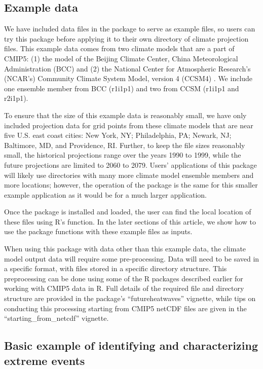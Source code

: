 \subsection{Example data}\label{example-data}

We have included data files in the package to serve as example files, so
users can try this package before applying it to their own directory of
climate projection files. This example data comes from two climate
models that are a part of CMIP5: (1) the model of the Beijing Climate
Center, China Meteorological Administration (BCC)
\citep{xin2013introduction} and (2) the National Center for Atmospheric
Research's (NCAR's) Community Climate System Model, version 4 (CCSM4)
\citep{gent2011community}. We include one ensemble member from BCC
(r1i1p1) and two from CCSM (r1i1p1 and r2i1p1).

To ensure that the size of this example data is reasonably small, we
have only included projection data for grid points from these climate
models that are near five U.S. east coast cities: New York, NY;
Philadelphia, PA; Newark, NJ; Baltimore, MD, and Providence, RI.
Further, to keep the file sizes reasonably small, the historical
projections range over the years 1990 to 1999, while the future
projections are limited to 2060 to 2079. Users' applications of this
package will likely use directories with many more climate model
ensemble members and more locations; however, the operation of the
package is the same for this smaller example application as it would be
for a much larger application.

Once the  package is installed and loaded, the user
can find the local location of these files using R's 
function. In the later sections of this article, we show how to use the
package functions with these example files as inputs.

When using this package with data other than this example data, the
climate model output data will require some pre-processing. Data will
need to be saved in a specific format, with files stored in a specific
directory structure. This preprocessing can be done using some of the R
packages described earlier for working with CMIP5 data in R. Full
details of the required file and directory structure are provided in the
package's ``futureheatwaves'' vignette, while tips on conducting this
processing starting from CMIP5 netCDF files are given in the
``starting\_from\_netcdf'' vignette.

\subsection{Basic example of identifying and characterizing extreme
events}\label{basic-example-of-identifying-and-characterizing-extreme-events}


